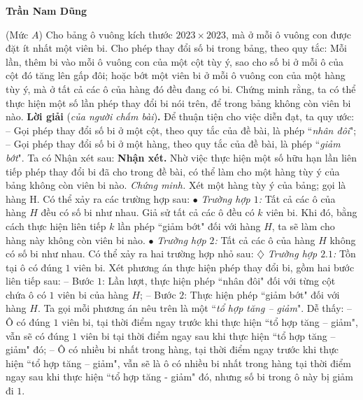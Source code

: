 \begin{multicols}{2}
\begin{flushright}
		\textbf{\color{thachthuctoanhoc}Trần Nam Dũng}
	\end{flushright}
	{}
	(Mức $A$) Cho bảng ô vuông kích thước $2023 \times 2023$, mà ở mỗi ô vuông con được đặt ít nhất một viên bi. Cho phép thay đổi số bi trong bảng, theo quy tắc: Mỗi lần, thêm bi vào mỗi ô vuông con của một cột tùy ý, sao cho số bi ở mỗi ô của cột đó tăng lên gấp đôi; hoặc bớt một viên bi ở mỗi ô vuông con của một hàng tùy ý, mà ở tất cả các ô của hàng đó đều đang có bi. Chứng minh rằng, ta có thể thực hiện một số lần phép thay đổi bi nói trên, để trong bảng không còn viên bi nào.
	\vskip 0.05cm
	\textbf{\color{thachthuctoanhoc}Lời giải} (\textit{của người chấm bài})\textbf{\color{thachthuctoanhoc}.}
	\vskip 0.05cm
	Để thuận tiện cho việc diễn đạt, ta quy ước:
	\vskip 0.05cm
	-- Gọi phép thay đổi số bi ở một cột, theo quy tắc của đề bài, là phép ``\textit{nhân đôi}";
	\vskip 0.05cm
	-- Gọi phép thay đổi số bi ở một hàng, theo quy tắc của đề bài, là phép ``\textit{giảm bớt}".
	\vskip 0.05cm
	Ta có Nhận xét sau:
	\vskip 0.05cm
	\textbf{\color{thachthuctoanhoc}Nhận xét.} Nhờ việc thực hiện một số hữu hạn lần liên tiếp phép thay đổi bi đã cho trong đề bài, có thể làm cho một hàng tùy ý của bảng không còn viên bi nào.
	\vskip 0.05cm
	\textit{Chứng minh.}
	\vskip 0.05cm
	Xét một hàng tùy ý của bảng; gọi là hàng H. Có thể xảy ra các trường hợp sau:
	\vskip 0.05cm
	$\bullet$ \textit{Trường hợp $1$:} Tất cả các ô của hàng $H$ đều có số bi như nhau.
	\vskip 0.05cm
	Giả sử tất cả các ô đều có $k$ viên bi.
	\vskip 0.05cm
	Khi đó, bằng cách thực hiện liên tiếp $k$ lần phép ``giảm bớt" đối với hàng $H$, ta sẽ làm cho hàng này không còn viên bi nào.
	\vskip 0.05cm
	$\bullet$ \textit{Trường hợp $2$:} Tất cả các ô của hàng $H$ không có số bi như nhau.
	\vskip 0.05cm
	Có thể xảy ra hai trường hợp nhỏ sau:
	\vskip 0.05cm
	$\diamondsuit$\textit{ Trường hợp $2.1$:} Tồn tại ô có đúng $1$ viên bi.
	\vskip 0.05cm
	Xét phương án thực hiện phép thay đổi bi, gồm hai bước liên tiếp sau:
	\vskip 0.05cm
	-- Bước $1$: Lần lượt, thực hiện phép ``nhân đôi" đối với từng cột chứa ô có $1$ viên bi của hàng $H$;
	\vskip 0.05cm
	-- Bước $2$: Thực hiện phép ``giảm bớt" đối với hàng $H$.
	\vskip 0.05cm
	Ta gọi mỗi phương án nêu trên là một ``\textit{tổ hợp tăng -- giảm}".
	\vskip 0.05cm
	Dễ thấy:
	\vskip 0.05cm
	-- Ô có đúng $1$ viên bi, tại thời điểm ngay trước khi thực hiện ``tổ hợp tăng -- giảm", vẫn sẽ có đúng $1$ viên bi tại thời điểm ngay sau khi thực hiện ``tổ hợp tăng -- giảm" đó;
	\vskip 0.05cm
	-- Ô có nhiều bi nhất trong hàng, tại thời điểm ngay trước khi thực hiện ``tổ hợp tăng -- giảm", vẫn sẽ là ô có nhiều bi nhất trong hàng tại thời điểm ngay sau khi thực hiện ``tổ hợp tăng - giảm" đó, nhưng số bi trong ô này bị giảm đi $1$.

\end{multicols}
